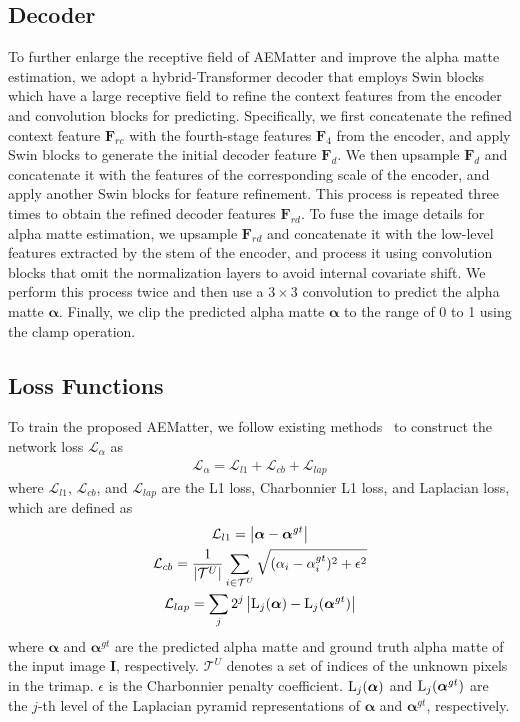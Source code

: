 \documentclass[10pt,twocolumn,letterpaper]{article}
\begin{document}
\subsection{Decoder}
To further enlarge the receptive field of AEMatter and improve the alpha matte estimation, we adopt a hybrid-Transformer decoder that employs Swin blocks which have a large receptive field to refine the context features from the encoder and convolution blocks for predicting. 
Specifically, we first concatenate the refined context feature $\bm{F}_{rc}$ with the fourth-stage features $\bm{F}_4$ from the encoder, and apply Swin blocks  to generate the initial decoder feature $\bm{F}_d$. 
We then upsample $\bm{F}_d$ and concatenate it with the features of the corresponding scale of the encoder, and apply another Swin blocks  for feature refinement. 
This process is repeated three times to obtain the refined decoder features $\bm{F}_{rd}$.
To fuse the image details for alpha matte estimation, we upsample $\bm{F}_{rd}$ and concatenate it with the low-level features extracted by the stem of the encoder, and process it using convolution blocks that omit the normalization layers to avoid internal covariate shift. 
We perform this process twice and then use a $3 \times 3$ convolution to predict the alpha matte $\bm{\alpha}$. 
Finally, we clip the predicted alpha matte $\bm{\alpha}$ to the range of 0 to 1 using the clamp operation.



\subsection{Loss Functions}
To train the proposed AEMatter, we follow existing methods~\cite{xu2017deep,forte2020fbamatting} to construct the network loss $\mathcal{L}_{\alpha}$ as 
\begin{equation}
\begin{aligned}
\mathcal{L}_{\alpha} = \mathcal{L}_{l1} + \mathcal{L}_{cb} + \mathcal{L}_{lap}
\end{aligned}
\end{equation}
where  $\mathcal{L}_{l1}$,  $\mathcal{L}_{cb}$, and $\mathcal{L}_{lap}$  are the L1  loss,  Charbonnier L1 loss,  and Laplacian loss, which are defined as
\begin{gather}
\mathcal{L}_{l1} =   \left |\bm{\alpha}-\bm{\alpha}^{gt}\right|\\
\mathcal{L}_{cb} = \frac{1}{|\mathcal{T}^U|}\sum_{{i\in\mathcal{T}^U}}{\sqrt{(\alpha_i-\alpha_i^{gt})^2+\epsilon^2}}\\
\mathcal{L}_{lap} =  \sum_{j}{2^{j}\left |{\rm L}_j(\bm{\alpha})-{\rm L}_j(\bm{\alpha}^{gt})\right|}
\end{gather}
where $\bm{\alpha}$ and $\bm{\alpha}^{gt}$ are the predicted alpha matte and ground truth alpha matte of the input image $\bm{I}$, respectively. 
$\mathcal{T}^U$ denotes  a set of indices of the unknown pixels in the trimap.
$\epsilon$ is the Charbonnier penalty coefficient. 
${\rm L}_j(\bm{\alpha})$ and ${\rm L}_j(\bm{\alpha}^{gt})$ are the $j$-th level of the Laplacian pyramid representations of $\bm{\alpha}$ and $\bm{\alpha}^{gt}$, respectively.
\end{document}
